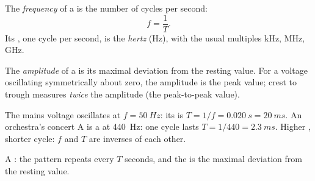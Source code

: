 \begin{definition}[Frequency]\label{def:g10:signals-and-waves:frequency}
The \emph{frequency} of a  is the number
of cycles per second:
\[
f = \frac{1}{T} .
\]
Its , one cycle per second, is the \emph{hertz}
(\unit{Hz}), with the usual multiples \unit{kHz}, \unit{MHz}, \unit{GHz}.
\end{definition}

\begin{definition}[Amplitude]\label{def:g10:signals-and-waves:amplitude}
The \emph{amplitude} of a  is its maximal
deviation from the resting value. For a voltage oscillating symmetrically
about zero, the amplitude is the peak value; crest to trough measures
\emph{twice} the amplitude (the peak-to-peak value).
\end{definition}

\begin{example}\label{ex:g10:signals-and-waves:mains}
The mains voltage oscillates at $f = \qty{50}{Hz}$: its  is
$T = 1/f = \qty{0.020}{s} = \qty{20}{ms}$. An orchestra's concert A is a
  at \qty{440}{Hz}: one cycle lasts
$T = 1/440 = \qty{2.3}{ms}$. Higher , shorter cycle: $f$ and $T$
are inverses of each other.
\end{example}

\begin{omfigure}

{\small A : the pattern repeats every $T$ seconds, and the
 is the maximal deviation from the resting value.}
\end{omfigure}

